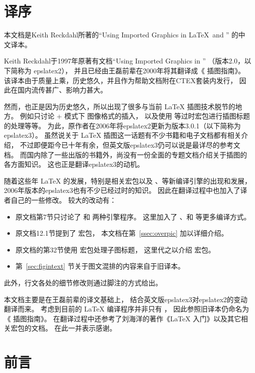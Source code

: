 
\section*{译序}

本文档是Keith Reckdahl所著的``Using Imported Graphics in \LaTeX\ and \pdfLaTeX'' 的中文译本。

Keith Reckdahl于1997年原著有文档``Using Imported Graphics in \LaTeXe{}''
（版本2.0，以下简称为 epslatex2），
并且已经由王磊前辈在2000年将其翻译成《\LaTeXe{} 插图指南》。
该译本由于质量上乘，历史悠久，并且作为帮助文档附在CTEX套装内发行，
因此在国内流传甚广、影响力甚大。

然而，也正是因为历史悠久，所以出现了很多与当前 \LaTeX{} 插图技术脱节的地方。
例如只讨论 + 模式下  图像格式的插入，
以及使用  等过时宏包进行插图标题的处理等等。
为此，原作者在2006年将epslatex2更新为版本3.0.1（以下简称为 epslatex3）。
虽然说关于 \LaTeX{} 插图这一话题有不少书籍和电子文档都有相关介绍，
不过即便距今已十年有余，但英文版epslatex3仍可以说是最详尽的参考文档。
而国内除了一些出版的书籍外，尚没有一份全面的专题文档介绍关于插图的各方面知识。
这也正是翻译epslatex3的动机。

随着这些年 \LaTeX{} 的发展，特别是相关宏包以及 \XeTeX{}、\LuaTeX 等新编译引擎的出现和发展，
2006年版本的epslatex3也有不少已经过时的知识。
因此在翻译过程中也加入了译者自己的一些修改。
较大的改动有：
\begin{itemize}
	\item 原文档第7节只讨论了  和  两种引擎程序。
	这里加入了 、和 等更多编译方式。
	\item 原文档12.1节提到了  宏包，
	本文档在第~\ref{ssec:overpic} 加以详细介绍。
	\item 原文档的第32节使用  宏包处理子图标题，
	这里代之以介绍  宏包。
	\item 第~\ref{sec:figintext} 节关于图文混排的内容来自于旧译本。
\end{itemize}
此外，行文各处的细节修改则通过脚注的方式给出。

本文档主要是在王磊前辈的译文基础上，
结合英文版epslatex3对epslatex2的变动翻译而来。
考虑到目前的 \LaTeX{} 编译程序并非只有 \pdfTeX{}，
因此参照旧译本仍命名为《\LaTeXe{} 插图指南》。
在翻译过程中还参考了刘海洋的著作《\LaTeX{} 入门》以及其它相关宏包的文档。
在此一并表示感谢。

\newpage
\section*{前言}
\label{sect:preface}

